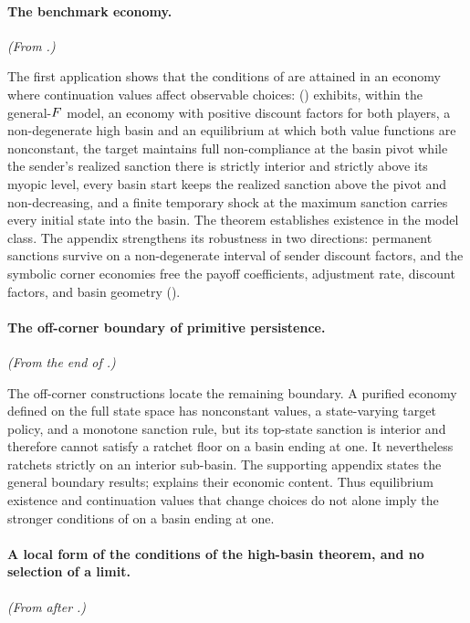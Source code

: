 \paragraph{The benchmark economy.} \emph{(From .)}

The first application shows that the conditions of  are
attained in an economy where continuation values affect observable
choices:  () exhibits,
within the general-$F$ model, an economy with positive discount factors for
both players, a non-degenerate high basin and an equilibrium at which both
value functions are nonconstant, the target maintains full non-compliance at the basin pivot
while the sender's realized sanction there is strictly interior and strictly
above its myopic level, every basin start keeps the realized sanction above
the pivot and non-decreasing, and a finite temporary shock at the maximum
sanction carries every initial state into the basin. The theorem establishes
existence in the model class. The appendix
strengthens its robustness in two
directions: permanent sanctions survive on a non-degenerate interval of
sender discount factors, and the symbolic corner economies free the payoff
coefficients, adjustment rate, discount factors, and basin geometry
().

\paragraph{The off-corner boundary of primitive persistence.} \emph{(From the end of .)}

The off-corner constructions locate the remaining boundary. A purified
economy defined on the full state space has nonconstant values, a state-varying
target policy, and a monotone sanction rule, but its top-state
sanction is interior and therefore cannot satisfy a ratchet floor on a
basin ending at one. It nevertheless ratchets strictly on an interior
sub-basin. The supporting appendix states the general boundary results;
 explains their economic content. Thus
equilibrium existence and continuation values that change choices do not alone
imply the stronger conditions of  on a basin ending at one.

\paragraph{A local form of the conditions of the high-basin theorem, and no selection of a limit.} \emph{(From after .)}

